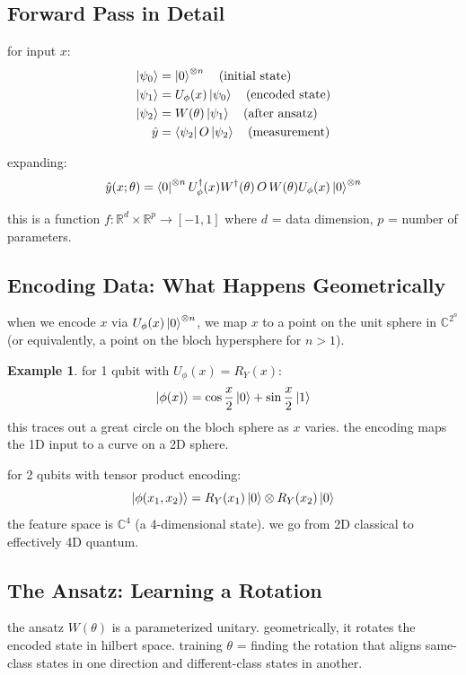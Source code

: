 \documentclass[11pt,a4paper]{article}
\theoremstyle{definition}
\newtheorem{example}{Example}[section]
\theoremstyle{remark}
\begin{document}
\subsection{Forward Pass in Detail}

for input $x$:
\begin{align}
\ket{\psi_0} &= \ket{0}^{\otimes n} \quad \text{(initial state)} \\
\ket{\psi_1} &= U_\phi(x)\ket{\psi_0} \quad \text{(encoded state)} \\
\ket{\psi_2} &= W(\theta)\ket{\psi_1} \quad \text{(after ansatz)} \\
\hat{y} &= \bra{\psi_2} O \ket{\psi_2} \quad \text{(measurement)}
\end{align}

expanding:
\[
\hat{y}(x;\theta) = \bra{0}^{\otimes n} U_\phi^\dagger(x) W^\dagger(\theta) \, O \, W(\theta) U_\phi(x) \ket{0}^{\otimes n}
\]

this is a function $f: \mathbb{R}^d \times \mathbb{R}^p \to [-1, 1]$ where $d$ = data dimension, $p$ = number of parameters.

\subsection{Encoding Data: What Happens Geometrically}

when we encode $x$ via $U_\phi(x)\ket{0}^{\otimes n}$, we map $x$ to a point on the unit sphere in $\mathbb{C}^{2^n}$ (or equivalently, a point on the bloch hypersphere for $n > 1$).

\begin{example}
for 1 qubit with $U_\phi(x) = R_Y(x)$:
\[
\ket{\phi(x)} = \cos\frac{x}{2}\ket{0} + \sin\frac{x}{2}\ket{1}
\]
this traces out a great circle on the bloch sphere as $x$ varies. the encoding maps the 1D input to a curve on a 2D sphere.

for 2 qubits with tensor product encoding:
\[
\ket{\phi(x_1, x_2)} = R_Y(x_1)\ket{0} \otimes R_Y(x_2)\ket{0}
\]
the feature space is $\mathbb{C}^4$ (a 4-dimensional state). we go from 2D classical to effectively 4D quantum.
\end{example}

\subsection{The Ansatz: Learning a Rotation}

the ansatz $W(\theta)$ is a parameterized unitary. geometrically, it rotates the encoded state in hilbert space. training $\theta$ = finding the rotation that aligns same-class states in one direction and different-class states in another.
\end{document}
